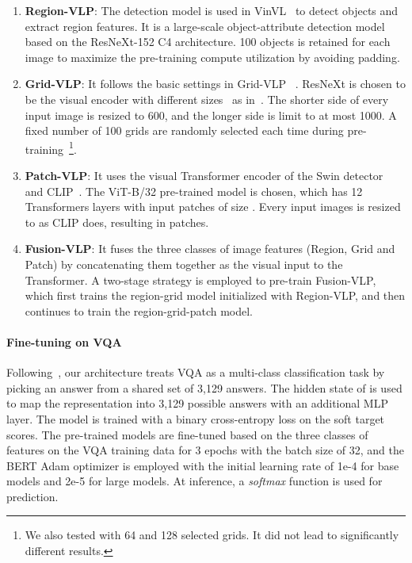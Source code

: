 \begin{enumerate}
    \item \textbf{Region-VLP}: The detection model is used in VinVL~\citep{zhang2021vinvl} to detect objects and extract region features. It is a large-scale object-attribute detection model based on the ResNeXt-152 C4 architecture. 100 objects is retained for each image to maximize the pre-training compute utilization by avoiding padding.
    
    \item \textbf{Grid-VLP}: It follows the basic settings in Grid-VLP~\citep{yan2021gridvlp}
    . ResNeXt is chosen to be the visual encoder with different sizes~\citep{xie2017aggregated} as in~\citep{jiang2020defense,huang2020pixel}. The shorter side of every input image is resized to 600, and the longer side is limit to at most 1000. A fixed number of 100 grids are randomly selected each time during pre-training~\footnote{\small{We also tested with 64 and 128 selected grids. It did not lead to significantly different results.}}. 
    
    \item \textbf{Patch-VLP}: It uses the visual Transformer encoder of the Swin detector~\citep{liu2021swin} and CLIP~\citep{radford2021learning}. The ViT-B/32 pre-trained model is chosen, which has 12 Transformers layers with input patches of size . Every input images is resized to  as CLIP does, resulting in  patches.
    
    \item \textbf{Fusion-VLP}: It fuses the three classes of image features (Region, Grid and Patch) by concatenating them together as the visual input to the Transformer. A two-stage strategy is employed to pre-train Fusion-VLP, which first trains the region-grid model initialized with Region-VLP, and then continues to train the region-grid-patch model.
\end{enumerate}

\paragraph{Fine-tuning on VQA}
Following~\citep{anderson2018bottom}, our architecture treats VQA as a multi-class classification task by picking an answer from a shared set of 3,129 answers. The hidden state of  is used to map the representation into 3,129 possible answers with an additional MLP layer. The model is trained with a binary cross-entropy loss on the soft target scores. The pre-trained models are fine-tuned based on the three classes of features on the VQA training data for 3 epochs with the batch size of 32, and the BERT Adam optimizer is employed with the initial learning rate of 1e-4 for base models and 2e-5 for large models. At inference, a \emph{softmax} function is used for prediction.

